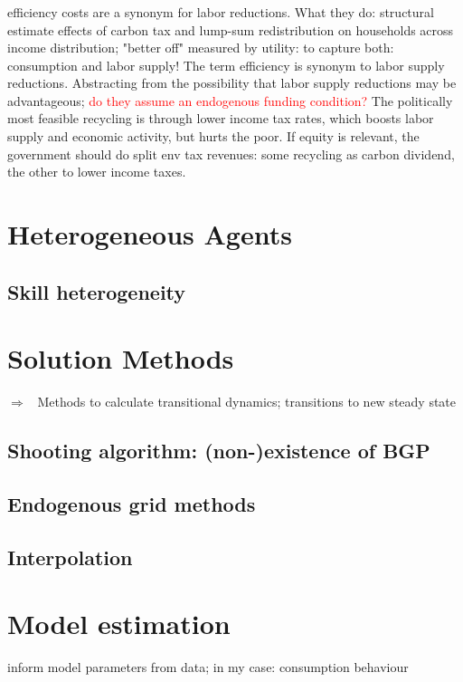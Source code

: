 \documentclass[12pt]{article}
\newcommand{\ar}{$\Rightarrow$ \ }
\newcommand{\tr}[1]{\textcolor{red}{#1}}
\begin{document}
\subsubsection{\cite{VANDERPLOEG2022103966}} 
efficiency costs are a synonym for labor reductions. 
What they do: 
structural estimate effects of carbon tax and lump-sum redistribution on households across income distribution; "better off" measured by utility: to capture both: consumption and labor supply!
The term efficiency is synonym to labor supply reductions. Abstracting from the possibility that labor supply reductions may be advantageous;\tr{ do they assume an endogenous funding condition?} The politically most feasible recycling is through lower income tax rates, which boosts labor supply and economic activity, but hurts the poor. If equity is relevant, the government should do split env tax revenues: some recycling as carbon dividend, the other to lower income taxes.


\section{Heterogeneous Agents}
\subsection{Skill heterogeneity}
\hypertarget{skills}{}

\section{Solution Methods}
\ar Methods to calculate transitional dynamics; transitions to new steady state
\subsection{Shooting algorithm: (non-)existence of BGP}
\subsection{Endogenous grid methods}
\subsection{Interpolation}

\section{Model estimation}
inform model parameters from data; in my case: consumption behaviour
\end{document}
